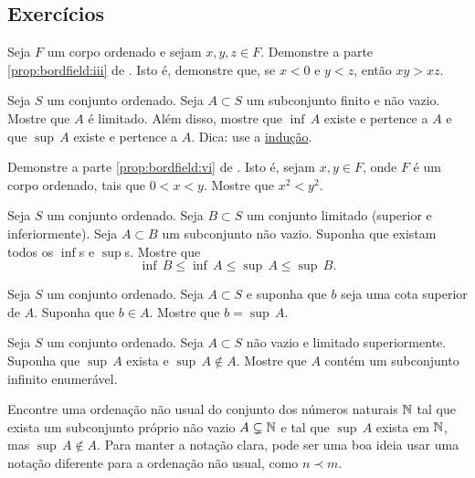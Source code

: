 \subsection{Exercícios}

\begin{exercise}
Seja $F$ um corpo ordenado e sejam $x,y,z \in F$. Demonstre a parte
\ref{prop:bordfield:iii} de .
Isto é, demonstre que, se $x < 0$ e $y < z$, então $xy > xz$.
\end{exercise}


\begin{exercise} \label{exercise:finitesethasminmax}
Seja $S$ um conjunto ordenado. Seja $A \subset S$ um subconjunto finito e não vazio.
Mostre que $A$ é limitado. Além disso,
mostre que
$\inf\, A$ existe e pertence a $A$ e que
$\sup\, A$ existe e pertence a $A$.
Dica: use a \hyperref[induction:thm]{indução}.
\end{exercise}

\begin{exercise} \label{exercise:squareineq}
Demonstre a parte \ref{prop:bordfield:vi} de .
Isto é, sejam $x, y \in F$, onde $F$ é um corpo ordenado, tais que
$0 < x < y$. Mostre que $x^2 < y^2$.
\end{exercise}

\begin{exercise}
Seja $S$ um conjunto ordenado. Seja $B \subset S$ um conjunto limitado (superior
e inferiormente). Seja $A \subset B$ um subconjunto não vazio.
Suponha que existam todos os $\inf$s e
$\sup$s. Mostre que
\begin{equation*}
\inf\, B \leq \inf\, A \leq \sup\, A \leq \sup\, B .
\end{equation*}
\end{exercise}

\begin{exercise}
Seja $S$ um conjunto ordenado. Seja $A \subset S$ e suponha que
$b$ seja uma cota superior de $A$. Suponha que $b \in A$. Mostre
que $b = \sup\, A$.
\end{exercise}

\begin{exercise}
Seja $S$ um conjunto ordenado. Seja $A \subset S$ não vazio e
limitado superiormente.
Suponha que $\sup\, A$ exista e
$\sup\, A \notin A$.
Mostre que $A$ contém um subconjunto infinito enumerável.
\end{exercise}

\begin{exercise}
Encontre uma ordenação não usual do conjunto dos números naturais ${\mathbb{N}}$
tal que exista um subconjunto próprio não vazio $A \subsetneq {\mathbb{N}}$
e tal que $\sup\, A$ exista em ${\mathbb{N}}$, mas $\sup\, A \notin A$.
Para manter a notação clara, pode ser uma boa ideia usar uma notação diferente
para a ordenação não usual, como $n \prec m$.
\end{exercise}

